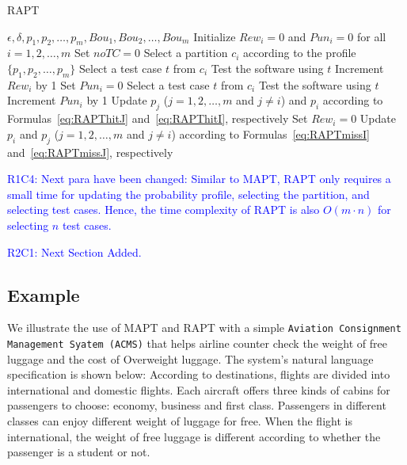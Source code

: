 \documentclass[10pt,journal,compsoc]{IEEEtran}
\begin{document}
\begin{algorithm}
	\caption{RAPT}
	\label{alg:RAPT}
	\begin{algorithmic}[1]
		\renewcommand{\algorithmicrequire}{\textbf{Input:}}
		\renewcommand{\algorithmicensure}{\textbf{Output:}}
		\renewcommand{\algorithmicendwhile}{\algorithmicend\_\algorithmicwhile}
		\renewcommand{\algorithmicendfor}{\algorithmicend\_\algorithmicfor}
		\renewcommand{\algorithmicendif}{\algorithmicend\_\algorithmicif}
		\renewcommand{\algorithmicthen}{}
		\renewcommand{\algorithmicdo}{}
		\REQUIRE $\epsilon, \delta, p_1, p_2, \ldots, p_m, Bou_1, Bou_2, \ldots, Bou_m$
		\STATE Initialize $Rew_i = 0$ and $Pun_i = 0$ for all $i = 1, 2, \ldots, m$
		\STATE Set $noTC = 0$
		\STATE Select a partition $c_i$ according to the profile $\{p_1, p_2, \ldots, p_m\}$
		\STATE Select a test case $t$ from $c_i$
		\STATE Test the software using $t$
		\STATE Increment $Rew_i$ by 1
		\STATE Set $Pun_i = 0$
		\STATE Select a test case $t$ from $c_i$
		\STATE Test the software using $t$
		\ENDWHILE
		\STATE Increment $Pun_i$ by 1
		\STATE Update $p_j$ ($j = 1, 2, \ldots, m$ and $j \neq i$) and $p_i$ according to Formulas~\ref{eq:RAPThitJ} and~\ref{eq:RAPThitI}, respectively
		\STATE Set $Rew_i = 0$
		\ELSE
		\STATE Update $p_i$ and $p_j$ ($j = 1, 2, \ldots, m$ and $j \neq i$) according to Formulas~\ref{eq:RAPTmissI} and~\ref{eq:RAPTmissJ}, respectively
		\ENDIF
		\ENDWHILE
	\end{algorithmic}
\end{algorithm}


\textcolor{blue}{R1C4: Next para have been changed:
Similar to MAPT, RAPT only requires a small time for updating the probability profile, selecting the partition, and selecting test cases. Hence, the time complexity of RAPT is also $O(m \cdot n)$ for selecting $n$ test cases.}

\textcolor{blue}{R2C1: Next Section Added.}
\subsection{Example}
We illustrate the use of MAPT and RAPT with a simple \texttt{Aviation Consignment Management Syatem (ACMS)} that helps airline counter check the weight of free luggage and the cost of Overweight luggage. The system's natural language specification is shown below: According to destinations, flights are divided into international and domestic flights. Each aircraft offers three kinds of cabins for passengers to choose: economy, business and first class. Passengers in different classes can enjoy different weight of luggage for free. When the flight is international, the weight of free luggage is different according to whether the passenger is a student or not.
\end{document}

